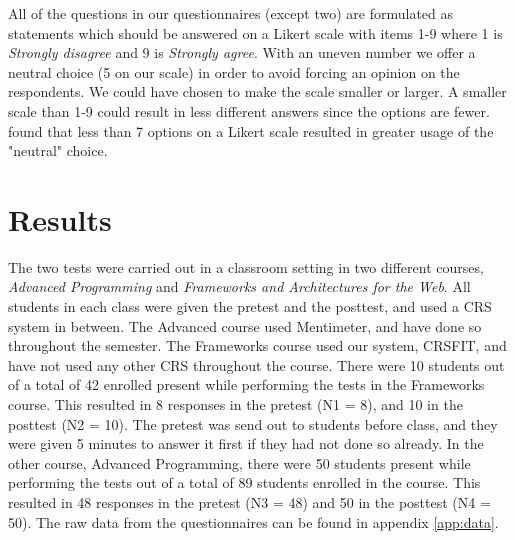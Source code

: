 All of the questions in our questionnaires (except two) are formulated as statements which should be answered on a Likert scale \cite{likert1932technique} with items 1-9 where 1 is \emph{Strongly disagree} and 9 is \emph{Strongly agree}. With an uneven number we offer a neutral choice (5 on our scale) in order to avoid forcing an opinion on the respondents. We could have chosen to make the scale smaller or larger. A smaller scale than 1-9 could result in less different answers since the options are fewer.  found that less than 7 options on a Likert scale resulted in greater usage of the "neutral" choice. %




\section{Results}

The two tests were carried out in a classroom setting in two different courses, \emph{Advanced Programming} and \emph{Frameworks and Architectures for the Web}. All students in each class were given the pretest and the posttest, and used a CRS system in between. The Advanced course used Mentimeter, and have done so throughout the semester. The Frameworks course used our system, CRSFIT, and have not used any other CRS throughout the course.
There were 10 students out of a total of 42 enrolled present while performing the tests in the Frameworks course. This resulted in 8 responses in the pretest (N1 = 8), and 10 in the posttest (N2 = 10). The pretest was send out to students before class, and they were given 5 minutes to answer it first if they had not done so already.
In the other course, Advanced Programming, there were 50 students present while performing the tests out of a total of 89 students enrolled in the course. This resulted in 48 responses in the pretest (N3 = 48) and 50 in the posttest (N4 = 50). 
The raw data from the questionnaires can be found in appendix \ref{app:data}.

